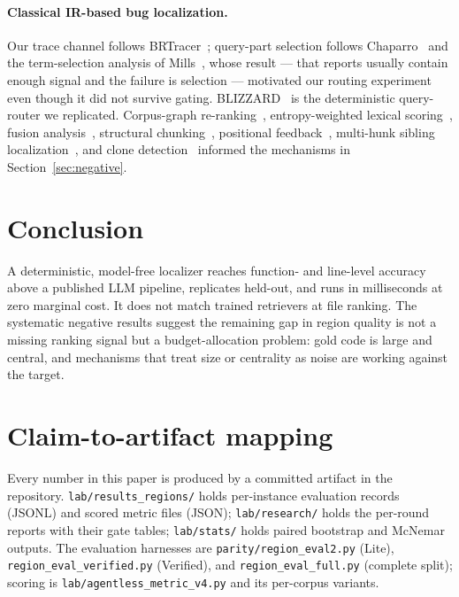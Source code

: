 \documentclass[11pt]{article}
\begin{document}
\paragraph{Classical IR-based bug localization.} Our trace channel follows
BRTracer~\cite{brtracer}; query-part selection follows
Chaparro~\cite{chaparro} and the term-selection analysis of
Mills~\cite{mills}, whose result --- that reports usually contain enough
signal and the failure is selection --- motivated our routing experiment even
though it did not survive gating. BLIZZARD~\cite{blizzard} is the deterministic
query-router we replicated. Corpus-graph
re-ranking~\cite{lexboost,gar}, entropy-weighted lexical
scoring~\cite{bmx}, fusion analysis~\cite{bruch}, structural
chunking~\cite{cast}, positional feedback~\cite{prm}, multi-hunk sibling
localization~\cite{hercules}, and clone detection~\cite{sourcerercc} informed
the mechanisms in Section~\ref{sec:negative}.

\section{Conclusion}

A deterministic, model-free localizer reaches function- and line-level
accuracy above a published LLM pipeline, replicates held-out, and runs in
milliseconds at zero marginal cost. It does not match trained retrievers at
file ranking. The systematic negative results suggest the remaining gap in
region quality is not a missing ranking signal but a budget-allocation
problem: gold code is large and central, and mechanisms that treat size or
centrality as noise are working against the target.

\appendix
\section{Claim-to-artifact mapping}

Every number in this paper is produced by a committed artifact in the
repository. \texttt{lab/results\_regions/} holds per-instance evaluation
records (JSONL) and scored metric files (JSON); \texttt{lab/research/} holds
the per-round reports with their gate tables;
\texttt{lab/stats/} holds paired bootstrap and McNemar outputs. The
evaluation harnesses are \texttt{parity/region\_eval2.py} (Lite),
\texttt{region\_eval\_verified.py} (Verified), and
\texttt{region\_eval\_full.py} (complete split); scoring is
\texttt{lab/agentless\_metric\_v4.py} and its per-corpus variants.



\end{document}
